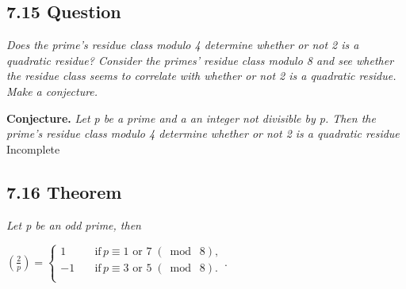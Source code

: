 \documentclass{article}
\begin{document}
\subsection*{7.15 Question} 
\quad \textit{Does the prime's residue class modulo 4 determine whether or not 2 is a quadratic residue? Consider the primes' residue class modulo 8 and see whether the residue class seems to correlate with whether or not 2 is a quadratic residue. Make a conjecture.}

\textbf{Conjecture.} \textit{Let p be a prime and a an integer not divisible by p. Then the prime's residue class modulo 4 determine whether or not 2 is a quadratic residue} Incomplete

\subsection*{7.16 Theorem} 
\quad \textit{Let p be an odd prime, then}
\begin{center}
    $(\frac{2}{p}) = \begin{cases}
          1 \quad &\text{if} \, p \equiv 1 \text{ or } 7\;(\bmod\; 8),\\
          -1 \quad &\text{if} \, p \equiv 3 \text{ or } 5 \;(\bmod\; 8).\\
     \end{cases}$.
\end{center}
\end{document}
